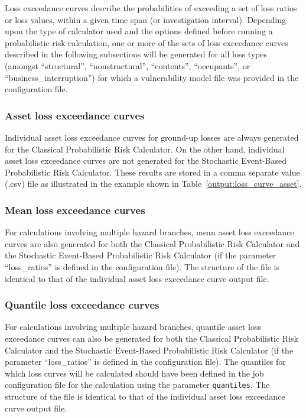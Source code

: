 Loss exceedance curves describe the probabilities of exceeding a set of loss
ratios or loss values, within a given time span (or investigation interval).
Depending upon the type of calculator used and the options defined before
running a probabilistic risk calculation, one or more of the sets of loss
exceedance curves described in the following subsections will be generated for
all loss types (amongst ``structural'', ``nonstructural'', ``contents'',
``occupants'', or ``business\_interruption'') for which a vulnerability model
file was provided in the configuration file.

\subsubsection{Asset loss exceedance curves}
\label{subsubsec:asset_loss_curves}

Individual asset loss exceedance curves for ground-up losses are always
generated for the Classical Probabilistic Risk Calculator. On the other hand,
individual asset loss exceedance curves are not generated for the Stochastic
Event-Based Probabilistic Risk Calculator. These results are stored in a comma
separate value (.csv) file as illustrated in the example shown in
Table~\ref{output:loss_curve_asset}.



\subsubsection{Mean loss exceedance curves}
\label{subsubsec:mean_loss_curves}

For calculations involving multiple hazard branches, mean asset loss
exceedance curves are also generated for both the Classical Probabilistic Risk
Calculator and the Stochastic Event-Based Probabilistic Risk Calculator (if
the parameter ``loss\_ratios'' is defined in the configuration file). The
structure of the file is identical to that of the individual asset loss
exceedance curve output file.

\subsubsection{Quantile loss exceedance curves}
\label{subsubsec:quantile_loss_curves}

For calculations involving multiple hazard branches, quantile asset loss
exceedance curves can also be generated for both the Classical Probabilistic
Risk Calculator and the Stochastic Event-Based Probabilistic Risk Calculator
(if the parameter ``loss\_ratios'' is defined in the configuration file). The
quantiles for which loss curves will be calculated should have been defined in
the job configuration file for the calculation using the parameter
\Verb+quantiles+. The structure of the file is identical to that of
the individual asset loss exceedance curve output file.

